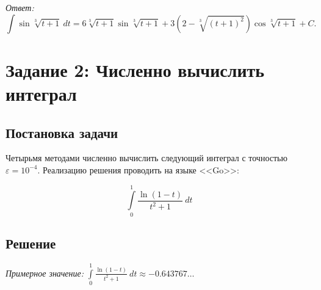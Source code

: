 \documentclass[14pt, a4paper, titlepage, fleqn]{extarticle}
\begin{document}
            \textit{Ответ:} 
                \[
                    \int \sin{ \sqrt[3]{t+1} } ~ dt
                    = 6 \sqrt[3]{t+1} \sin{\sqrt[3]{t+1}}
                    + 3\left( 2 - \sqrt[3]{(t+1)^2} \right) \cos{\sqrt[3]{t+1}} + C.
                \]

    \pagebreak

    \section{Задание 2: Численно вычислить интеграл}
        \subsection{Постановка задачи}
            Четырьмя методами численно вычислить следующий интеграл
            с точностью \( \varepsilon = 10^{-4} \).
            Реализацию решения проводить на языке <<Go>>:
            
            \[ \int\limits_0^1 \frac{\ln(1-t)}{t^2+1} ~ dt \]

        \subsection{Решение}
            \textit{Примерное значение:}
                \( 
                    \displaystyle
                    \int\limits_0^1 \frac{\ln(1-t)}{t^2+1} ~ dt \approx -0.643767\dots
                \)
\end{document}
